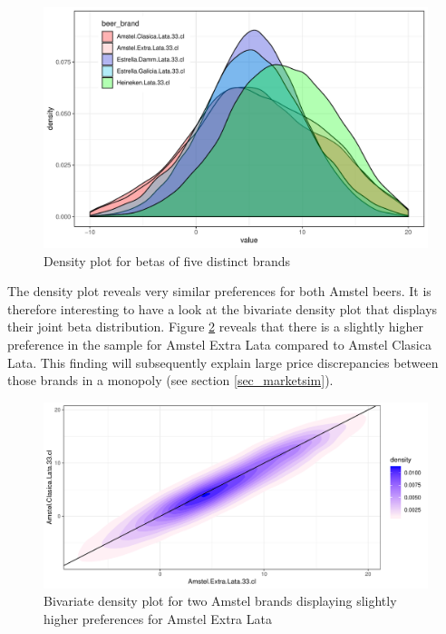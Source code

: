 \documentclass[12pt,a4paper]{article}
\begin{document}
\begin{figure}[ht]
	\centering
  \includegraphics[scale = 0.6]{figures/dens_betas_five_in_one.pdf}
	\caption{Density plot for betas of five distinct brands}
	\label{fig_dens_five}
\end{figure}

The density plot reveals very similar preferences for both Amstel beers.
It is therefore interesting to have a look at the bivariate density plot that displays their joint beta distribution.
Figure \ref{fig_dens_amstel_biv} reveals that there is a slightly higher preference in the sample for Amstel Extra Lata compared to Amstel Clasica Lata.
This finding will subsequently explain large price discrepancies between those brands in a monopoly (see section \ref{sec_marketsim}).

\begin{figure}[ht]
	\centering
  \includegraphics[scale = 0.6]{figures/amstel_bivariate_density.pdf}
	\caption{Bivariate density plot for two Amstel brands displaying slightly higher preferences for Amstel Extra Lata}
	\label{fig_dens_amstel_biv}
\end{figure}
\end{document}
